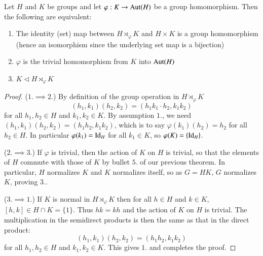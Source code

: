 \documentclass[12pt, a4paper, oneside, openright, titlepage]{book}
\begin{document}
\begin{prop}
    Let $H$ and $K$ be groups and let $\varphi:K\rightarrow \operatorname{Aut}(H)$ be a group homomorphism. Then the following are equivalent: \begin{enumerate}
        \item The identity (set) map between $H\rtimes_{\varphi}K$ and $H\times K$ is a group homomorphism (hence an isomorphism since the underlying set map is a bijection)
        \item $\varphi$ is the trivial homomorphism from $K$ into $\operatorname{Aut}(H)$
        \item $K\vartriangleleft H\rtimes_{\varphi}K$
    \end{enumerate}
\end{prop}
\begin{proof}
    ($1.\implies 2.$) By definition of the group operation in $H\rtimes_{\varphi}K$ \begin{equation*}
        (h_1,k_1)(h_2,k_2) = (h_1k_1\cdot h_2,k_1k_2)
    \end{equation*}
    for all $h_1,h_2 \in H$ and $k_1,k_2 \in K$. By assumption $1.$, we need $(h_1,k_1)(h_2,k_2)=(h_1h_2,k_1k_2)$, which is to say $\varphi(k_1)(h_2) = h_2$ for all $h_2 \in H$. In particular $\varphi(k_1) = \operatorname{Id}_H$ for all $k_1 \in K$, so $\varphi(K) = \{\operatorname{Id}_H\}$.

    ($2.\implies 3.$) If $\varphi$ is trivial, then the action of $K$ on $H$ is trivial, so that the elements of $H$ commute with those of $K$ by bullet $5.$ of our previous theorem. In particular, $H$ normalizes $K$ and $K$ normalizes itself, so as $G = HK$, $G$ normalizes $K$, proving $3.$.
    

    ($3.\implies 1.$) If $K$ is normal in $H \rtimes_{\varphi} K$ then for all $h \in H$ and $k \in K$, $[h,k] \in H\cap K = \{1\}$. Thus $hk = kh$ and the action of $K$ on $H$ is trivial. The multiplication in the semidirect products is then the same as that in the direct product: \begin{equation*}
        (h_1,k_1)(h_2,k_2) = (h_1h_2,k_1k_2)
    \end{equation*}
    for all $h_1,h_2 \in H$ and $k_1,k_2 \in K$. This gives $1.$ and completes the proof.
\end{proof}
\end{document}
